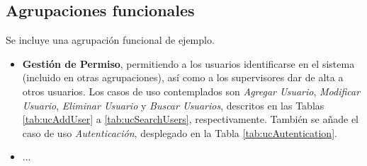 \subsection{\forlnameref Agrupaciones funcionales}
\label{sec:functionalGroups}

\begin{shaded}
Se incluye una agrupación funcional de ejemplo.
\end{shaded}

\begin{itemize}
    \item \textbf{Gestión de Permiso}, permitiendo a los usuarios identificarse en el sistema (incluido en otras agrupaciones), así como a los supervisores dar de alta a otros usuarios. Los casos de uso contemplados son \textit{Agregar Usuario}, \textit{Modificar Usuario}, \textit{Eliminar Usuario} y \textit{Buscar Usuarios}, descritos en las Tablas \ref{tab:ucAddUser} a \ref{tab:ucSearchUsers}, respectivamente. También se añade el caso de uso \textit{Autenticación}, desplegado en la Tabla \ref{tab:ucAutentication}.
    \item ...
\end{itemize}